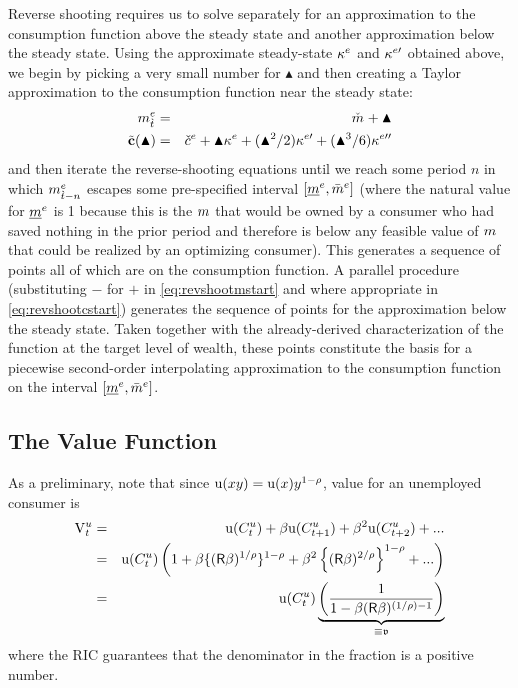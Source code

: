 \documentclass{handout}
\begin{document}
Reverse shooting requires us to solve separately for an approximation to the consumption function above the steady state and 
another approximation below the steady state.  Using the approximate steady-state $\kappa^{e}$ and $\kappa^{e\prime}$ 
obtained above, we begin by picking a very small number for $\blacktriangle$ and then creating a Taylor
approximation to the consumption function near the steady state:
\begin{eqnarray}
  \mRatE_{\Alt{t}} & = & \mTarg^{\null} + \blacktriangle  \label{eq:revshootmstart} 
\\ \tilde{\mathbf{c}}(\blacktriangle) & = & \cTarg^{e} + \blacktriangle \MPCE+ (\blacktriangle^{2}/2) \MPC^{e\prime}+ (\blacktriangle^{3}/6) \MPC^{e\prime\prime} \label{eq:revshootcstart}
\end{eqnarray}
and then iterate the reverse-shooting equations until we reach some period $n$ in
which $m^{e}_{\grave{t}-n}$ escapes some pre-specified interval $[\underline{m}^{e},\bar{m}^{e}]$ (where the natural 
value for $\underline{m}^{e}$ is 1 because this is the $m$ that would be owned by a consumer who had saved
nothing in the prior period and therefore is below any feasible value of $m$ that could be realized by an 
optimizing consumer).  This generates a sequence of points all of which
are on the consumption function.  A parallel procedure (substituting $-$ for
$+$ in \eqref{eq:revshootmstart} and where appropriate in \eqref{eq:revshootcstart}) generates the sequence of points for the approximation below the 
steady state.  Taken together with the already-derived characterization of the function
at the target level of wealth, these points constitute the basis for a piecewise second-order interpolating approximation to the
consumption function on the interval $[\underline{m}^{e},\bar{m}^{e}]$.

\subsection{The Value Function}

As a preliminary, note that since ${\mathrm{u}}(xy)={\mathrm{u}}(x)y^{1-\rho}$, value for an unemployed consumer is 
\begin{eqnarray}
  \mathrm{V}_{t}^{u} & = & {\mathrm{u}}(C_{t}^{u})+\beta {\ensuremath{\mathrm{u}}}(C_{t+1}^{u}) + \beta^{2} {\mathrm{u}}(C_{t+2}^{u})+...
\\ & = & {\mathrm{u}}(C_{t}^{u})\left(1+\beta \{(\mathsf{R} \beta)^{1/\rho}\}^{1-\rho} + \beta^{2}\left\{(\mathsf{R} \beta)^{2/\rho}\right\}^{1-\rho}+...\right)
\\ & = & {\mathrm{u}}(C_{t}^{u})\underbrace{\left(\frac{1}{1-\beta (\mathsf{R} \beta)^{(1/\rho)-1}}\right)}_{\equiv \mathfrak{v}}
\end{eqnarray}
where the RIC guarantees that the denominator in the fraction is a positive number.  
\end{document}
